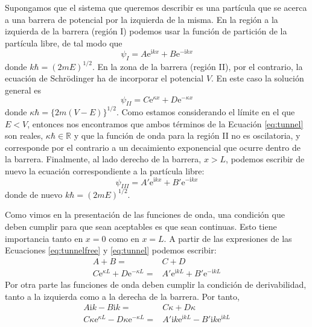Supongamos que el sistema que queremos describir es una 
partícula que se acerca a una barrera de potencial por la 
izquierda de la misma. En la región a la izquierda de la 
barrera (región I) podemos usar la función de partición de 
la partícula libre, de tal modo que
\begin{equation}
    \psi_I=A\mathrm{e}^{\mathrm{i}kx} +
    B\mathrm{e}^{-\mathrm{i}kx}
    \label{eq:tunnelfree}
\end{equation}
donde $k\hbar=(2mE)^{1/2}$. En la zona de la barrera
(región II), por el contrario, la ecuación de Schrödinger 
ha de  incorporar el potencial $V$. En este caso la solución
general es
\begin{equation}
    \psi_{II}=C\mathrm{e}^{\kappa x} + D\mathrm{e}^{-\kappa x}
\label{eq:tunnel}
\end{equation}
donde $\kappa\hbar=\{2m(V-E)\}^{1/2}$. Como estamos
considerando el límite en el que $E<V$, entonces nos encontramos que ambos términos de la Ecuación 
\ref{eq:tunnel} son reales, $\kappa\hbar\in \mathbb{R}$ y
que la función de onda para la región II no es oscilatoria,
y corresponde por el contrario a un decaimiento exponencial
que ocurre dentro de la barrera.
Finalmente, al lado derecho de la barrera, $x>L$, podemos escribir de nuevo la ecuación 
correspondiente a la partícula libre:
\begin{equation}
    \psi_{III}=A'\mathrm{e}^{\mathrm{i}kx} + B'\mathrm{e}^{-\mathrm{i}kx}
\end{equation}
donde de nuevo $k\hbar=(2mE)^{1/2}$.

Como vimos en la presentación de las funciones de onda, 
una condición que deben cumplir para que sean aceptables 
es que sean continuas. Esto tiene importancia tanto en $x=0$
como en $x=L$. A partir de las expresiones de las Ecuaciones
\ref{eq:tunnelfree} y \ref{eq:tunnel} podemos escribir:
\begin{subequations}
    \begin{align}
         A + B =&C + D \\
         C\mathrm{e}^{\kappa L} + D\mathrm{e}^{-\kappa L}=&
         A'\mathrm{e}^{\mathrm{i}kL} + B'\mathrm{e}^{-\mathrm{i}kL}
    \end{align}
\end{subequations}
Por otra parte las funciones de onda deben cumplir la
condición de derivabilidad, tanto a la izquierda como a
la derecha de la barrera. Por tanto,
\begin{subequations}
    \begin{align}
        A\mathrm{i}k-B\mathrm{i}k =& C\kappa + D\kappa \\
        C\kappa\mathrm{e}^{\kappa L} - D\kappa\mathrm{e}^{-\kappa L} =& A'\mathrm{i}k\mathrm{e}^{\mathrm{i}kL}-B'\mathrm{i}k\mathrm{e}^{\mathrm{i}kL}
    \end{align}
\end{subequations}

